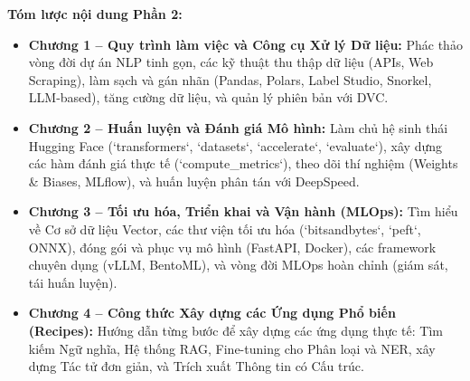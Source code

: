 \documentclass[11pt, a4paper, twoside]{book}
\begin{document}
\noindent
\textbf{Tóm lược nội dung Phần 2:}
\begin{itemize}[leftmargin=*]
    \item \textbf{Chương 1 – Quy trình làm việc và Công cụ Xử lý Dữ liệu:} 
    Phác thảo vòng đời dự án NLP tinh gọn, các kỹ thuật thu thập dữ liệu (APIs, Web Scraping), 
    làm sạch và gán nhãn (Pandas, Polars, Label Studio, Snorkel, LLM-based), 
    tăng cường dữ liệu, và quản lý phiên bản với DVC.
    
    \item \textbf{Chương 2 – Huấn luyện và Đánh giá Mô hình:} 
    Làm chủ hệ sinh thái Hugging Face (`transformers`, `datasets`, `accelerate`, `evaluate`), 
    xây dựng các hàm đánh giá thực tế (`compute\_metrics`), theo dõi thí nghiệm 
    (Weights \& Biases, MLflow), và huấn luyện phân tán với DeepSpeed.
    
    \item \textbf{Chương 3 – Tối ưu hóa, Triển khai và Vận hành (MLOps):} 
    Tìm hiểu về Cơ sở dữ liệu Vector, các thư viện tối ưu hóa (`bitsandbytes`, `peft`, ONNX),
    đóng gói và phục vụ mô hình (FastAPI, Docker), các framework chuyên dụng (vLLM, BentoML), 
    và vòng đời MLOps hoàn chỉnh (giám sát, tái huấn luyện).
    
    \item \textbf{Chương 4 – Công thức Xây dựng các Ứng dụng Phổ biến (Recipes):} 
    Hướng dẫn từng bước để xây dựng các ứng dụng thực tế: Tìm kiếm Ngữ nghĩa, 
    Hệ thống RAG, Fine-tuning cho Phân loại và NER, xây dựng Tác tử đơn giản, 
    và Trích xuất Thông tin có Cấu trúc.
\end{itemize}

 



\end{document}
